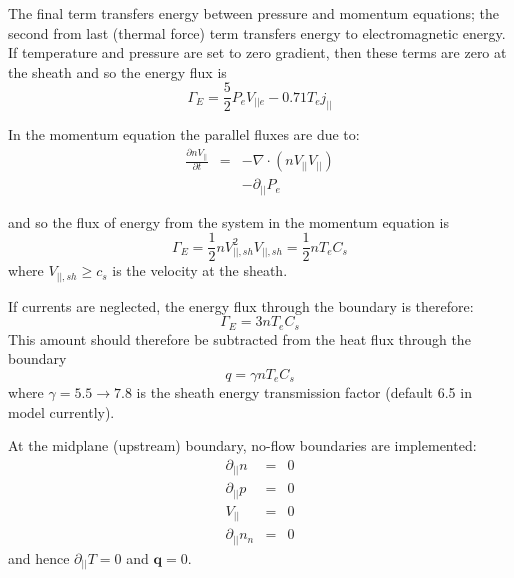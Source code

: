 \documentclass[12pt,a4paper]{article}
\begin{document}
The final term transfers energy between pressure and momentum equations; the second from last (thermal force) term transfers energy to electromagnetic energy. 
If temperature and pressure are set to zero gradient, then these terms are zero at the sheath and so the energy flux is
\begin{equation}
  \Gamma_E = \frac{5}{2}P_eV_{||e} - 0.71T_ej_{||}
\end{equation}

In the momentum equation the parallel fluxes are due to:
\begin{eqnarray}
  \frac{\partial nV_{||}}{\partial t} &=& -\nabla\cdot\left(nV_{||} V_{||}\right) \\
  && - \partial_{||}P_e
\end{eqnarray}

and so the flux of energy from the system in the momentum equation is
\begin{equation}
  \Gamma_E = \frac{1}{2} nV_{||,sh}^2V_{||,sh} = \frac{1}{2}nT_eC_s
\end{equation}
where $V_{||,sh} \ge c_s$ is the velocity at the sheath.

If currents are neglected, the energy flux through the boundary is therefore:
\[
\Gamma_E = 3nT_eC_s
\]
This amount should therefore be subtracted from the heat flux through the boundary
\[
q = \gamma nT_e C_s
\]
where $\gamma = 5.5 \rightarrow 7.8$ is the sheath energy transmission factor (default 6.5 in model currently).

At the midplane (upstream) boundary, no-flow boundaries are implemented:
\begin{eqnarray}
  \partial_{||}n &=& 0 \\
  \partial_{||}p &=& 0 \nonumber \\
  V_{||} &=& 0 \nonumber \\
  \partial_{||}n_n &=& 0 \nonumber
\end{eqnarray}
and hence $\partial_{||}T = 0$ and $\mathbf{q} = 0$.
\end{document}
